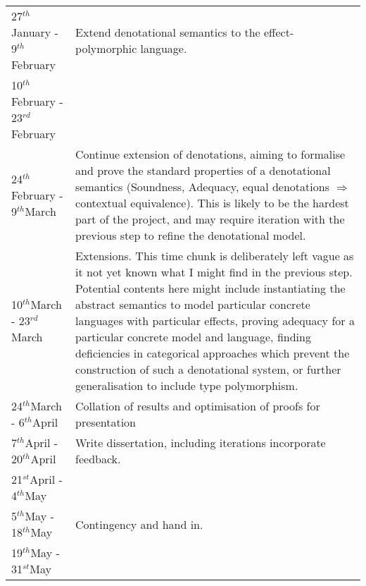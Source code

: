 \documentclass[11pt]{article}
\newcommand{\st}{$^{st}$}
\renewcommand{\th}{$^{th}$}
\newcommand{\rd}{$^{rd}$}
\begin{document}
\begin{tabular}{|p{6cm}||p{10cm}|}
	27\th January - 9\th February &  Extend denotational semantics to the effect-polymorphic language.
	\\\cline{1-1}
	10\th February - 23\rd February &  \\\hline
	24\th February - 9\th March & Continue extension of denotations, aiming to formalise and prove the standard properties of a denotational semantics (Soundness, Adequacy, equal denotations $\Rightarrow$ contextual equivalence). This is likely to be the hardest part of the project, and may require iteration with the previous step to refine the denotational model. \\\hline
	10\th March - 23\rd March & Extensions. This time chunk is deliberately left vague as it not yet known what I might find in the previous step. Potential contents here might include instantiating the abstract semantics to model particular concrete languages with particular effects, proving adequacy for a particular concrete model and language, finding deficiencies in categorical approaches which prevent the construction of such a denotational system, or further generalisation to include type polymorphism. \\\hline
	24\th March - 6\th April & Collation of results and optimisation of proofs for presentation \\\hline
	7\th April - 20\th April & Write dissertation, including iterations incorporate feedback. \\\cline{1-1}
	21\st April - 4\th May &\\\hline
	5\th May - 18\th May & Contingency and hand in.\\\cline{1-1}
	19\th May - 31\st May & \\
\hline
\end{tabular}

\newpage
\appendix
\end{document}
